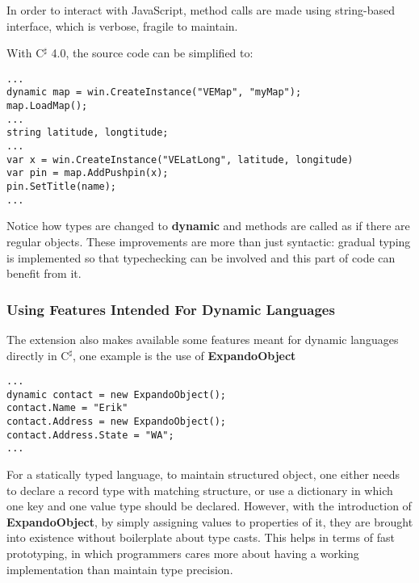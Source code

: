 In order to interact with JavaScript, method calls
are made using string-based interface, which is verbose, fragile to maintain.

With C$^\sharp$ 4.0, the source code can be simplified to:

\begin{verbatim}
...
dynamic map = win.CreateInstance("VEMap", "myMap");
map.LoadMap();
...
string latitude, longtitude;
...
var x = win.CreateInstance("VELatLong", latitude, longitude)
var pin = map.AddPushpin(x);
pin.SetTitle(name);
...
\end{verbatim}

Notice how types are changed to \textbf{dynamic} and methods are called
as if there are regular objects.
These improvements are more than just syntactic: gradual typing is implemented
so that typechecking can be involved and this part of code can benefit from it.

\subsubsection{Using Features Intended For Dynamic Languages}

The extension also makes available some features meant for dynamic languages
directly in C$^\sharp$, one example is the use of \textbf{ExpandoObject}

\begin{verbatim}
...
dynamic contact = new ExpandoObject();
contact.Name = "Erik"
contact.Address = new ExpandoObject();
contact.Address.State = "WA";
...
\end{verbatim}

For a statically typed language, to maintain structured object,
one either needs to declare a record type with matching structure,
or use a dictionary in which one key and one value type should be declared.
However, with the introduction of \textbf{ExpandoObject},
by simply assigning values to properties of it,
they are brought into existence without boilerplate about type casts.
This helps in terms of fast prototyping, in which programmers cares more about
having a working implementation than maintain type precision.

